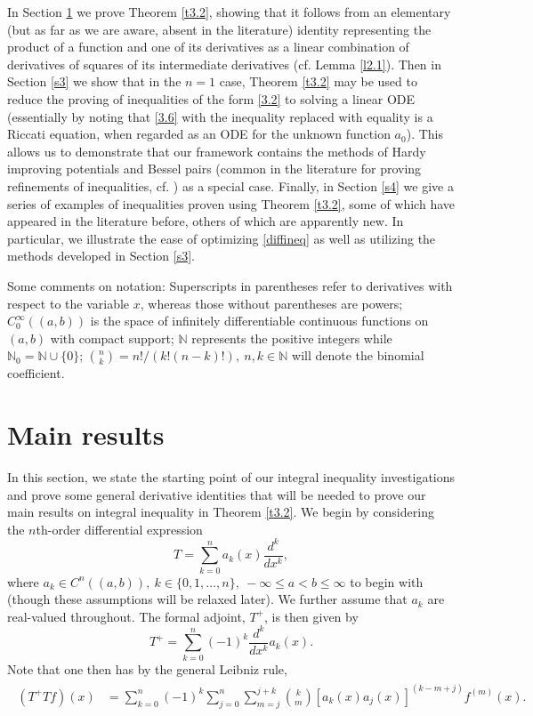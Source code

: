 \documentclass[reqno,10pt,centertags]{amsart}
\newcommand{\bbN}{{\mathbb{N}}}
\newcommand{\lb}{\label}
\numberwithin{equation}{section}
\theoremstyle{remark}
\begin{document}
In Section \ref{s2} we prove Theorem \ref{t3.2}, showing that it follows from an elementary (but as far as we are aware, absent in the literature) identity representing the product of a function and one of its derivatives as a linear combination of derivatives of squares of its intermediate derivatives (cf. Lemma \ref{l2.1}). Then in Section \ref{s3} we show that in the $n=1$ case, Theorem \ref{t3.2} may be used to reduce the proving of inequalities of the form \ref{3.2} to solving a linear ODE (essentially by noting that \ref{3.6} with the inequality replaced with equality is a Riccati equation, when regarded as an ODE for the unknown function $a_0$). This allows us to demonstrate that our framework contains the methods of Hardy improving potentials and Bessel pairs (common in the literature for proving refinements of inequalities, cf. \cite{GM11,GM13}) as a special case. Finally, in Section \ref{s4} we give a series of examples of inequalities proven using Theorem \ref{t3.2}, some of which have appeared in the literature before, others of which are apparently new. In particular, we illustrate the ease of optimizing \eqref{diffineq} as well as utilizing the methods developed in Section \ref{s3}.

Some comments on notation: Superscripts in parentheses refer to derivatives with respect to the variable $x$, whereas those without parentheses are powers; $C_0^\infty((a,b))$ is the space of infinitely differentiable continuous functions on $(a,b)$ with compact support; $\bbN$ represents the positive integers while $\bbN_0=\bbN\cup\{0\}$; $\binom{n}{k}=n!/(k!(n-k)!),\ n,k\in\bbN$ will denote the binomial coefficient.

\section{Main results}\lb{s2}

In this section, we state the starting point of our integral inequality investigations and prove some general derivative identities that will be needed to prove our main results on integral inequality in Theorem \ref{t3.2}.
We begin by considering the $n$th-order differential expression
\begin{equation}\label{2.1}
T=\sum_{k=0}^n a_k(x) \frac{d^k}{dx^k},
\end{equation}
where $a_k\in C^n((a,b)),\ k\in\{0,1,\dots,n\},\ -\infty\leq a<b\leq\infty$ to begin with (though these assumptions will be relaxed later). We further assume that $a_k$ are real-valued throughout. 
The formal adjoint, $T^+$, is then given by
\begin{equation}
T^+=\sum_{k=0}^n (-1)^k \frac{d^k}{dx^k} a_k(x).
\end{equation}
Note that one then has by the general Leibniz rule,
\begin{align}
\begin{split}\label{2.3}
(T^+ T f)(x)&=\sum_{k=0}^n (-1)^k \sum_{j=0}^n \sum_{m=j}^{j+k} {k \choose m} [a_k(x)a_j(x)]^{(k-m+j)} f^{(m)}(x).
\end{split}
\end{align}
\end{document}
